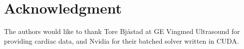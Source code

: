 \documentclass[conference]{IEEEtran}
\begin{document}
%











\section*{Acknowledgment}
The authors would like to thank Tore Bj\aa{}stad at GE Vingmed Ultrasound for providing cardiac data, and Nvidia for their batched solver written in CUDA. 





\end{document}
